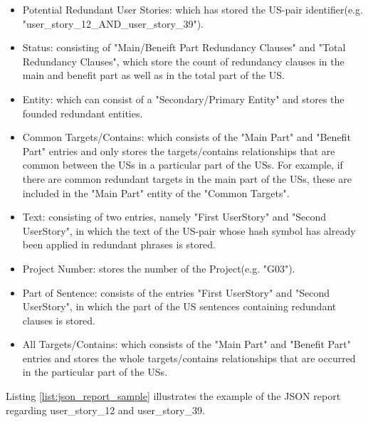 \begin{itemize}
	\item Potential Redundant User Stories:  which has stored the US-pair identifier(e.g. "user\_story\_12\_AND\_user\_story\_39"). 
	
	\item Status: consisting of "Main/Beneift Part Redundancy Clauses" and "Total Redundancy Clauses", which store the count of redundancy clauses in the main and benefit part as well as in the total part of the US.
	
	\item Entity: which can consist of a "Secondary/Primary Entity" and stores the founded redundant entities.
	
	\item Common Targets/Contains: which consists of the "Main Part" and "Benefit Part" entries and only stores the targets/contains relationships that are common between the USs in a particular part of the USs. For example, if there are common redundant targets in the main part of the USs, these are included in the "Main Part" entity of the "Common Targets".
	
	\item Text: consisting of two entries, namely "First UserStory" and "Second UserStory", in which the text of the US-pair whose hash symbol has already been applied in redundant phrases is stored.
	
	\item Project Number: stores the number of the Project(e.g. "G03").
	
	\item Part of Sentence: consists of the entries "First UserStory" and "Second UserStory", in which the part of the US sentences containing redundant clauses is stored.
	
	\item All Targets/Contains: which consists of the "Main Part" and "Benefit Part" entries and stores the whole targets/contains relationships that are occurred in the particular part of the USs.
	
\end{itemize}
\begin{example}
	Listing \ref{list:json_report_sample} illustrates the example of the JSON report regarding user\_story\_12 and user\_story\_39.
\end{example}
